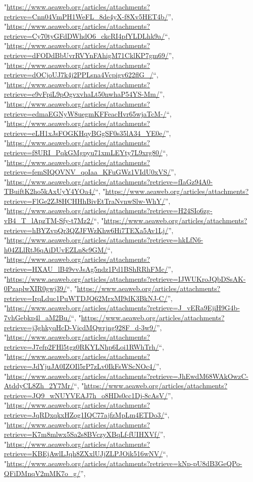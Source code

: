 \documentclass[]{article}
\begin{document}
\begin{itemize}
  "\url{https://www.aeaweb.org/articles/attachments?retrieve=Cnn04VmPH1WeFL_8de4yX-f8Xv5HET4b/}'',
  "\url{https://www.aeaweb.org/articles/attachments?retrieve=Cy70tyGFdDWhdO6_ckcRI4pfYLDLhk9a/}``,
  "\url{https://www.aeaweb.org/articles/attachments?retrieve=dFODdBbUvrRVYnFAhigM71CklKP7gm69/}'',
  "\url{https://www.aeaweb.org/articles/attachments?retrieve=dOCjoUJ7k4j2PPLsna4Vcpigv622flG_/}``,
  "\url{https://www.aeaweb.org/articles/attachments?retrieve=e9vFpiL9pOgvxvhaLt50nwhaP54YS-Mm/}'',
  "\url{https://www.aeaweb.org/articles/attachments?retrieve=edmaEGNyW8uegmKFFeacHvr65wjaTcM-/}``,
  "\url{https://www.aeaweb.org/articles/attachments?retrieve=eLH1xJsFOGKHqyBGgSF0s35lA34_YE0e/}'',
  "\url{https://www.aeaweb.org/articles/attachments?retrieve=f8URI_PqkGMgpyu71xmLEYty7L9xrg80/}``,
  "\url{https://www.aeaweb.org/articles/attachments?retrieve=femSIQOVNV_qoIaa_KFuGWz1VIdU0xVS/}'',
  "\url{https://www.aeaweb.org/articles/attachments?retrieve=fIaGz94A0-TBuiftK2ho5kAxUyY4YOa4/}``,
  "\url{https://www.aeaweb.org/articles/attachments?retrieve=FlGe2ZJ8HCHHhBivEtTraNvnwSlw-WhY/}'',
  "\url{https://www.aeaweb.org/articles/attachments?retrieve=H24SIo6zg-vB4_T_lApzTM-Sfy-t7Mz2/}``,
  "\url{https://www.aeaweb.org/articles/attachments?retrieve=hBYZvpQr3QZJFWzKhw6Hi7TEXa5Av1Lj/}'',
  "\url{https://www.aeaweb.org/articles/attachments?retrieve=hkLfN6-h04ZLlRtJ6qAiDUvEZLn8c9GM/}``,
  "\url{https://www.aeaweb.org/articles/attachments?retrieve=HXAU_lB49vvJsAg5ndz1Pd1BShRRhFMc/}'',
  "\url{https://www.aeaweb.org/articles/attachments?retrieve=IJWUKroJQbDSsAK-0PzaplwXIR0gwj39/}``,
  "\url{https://www.aeaweb.org/articles/attachments?retrieve=IrqLduc1PuWTDJQ62MrxMI9dK3BkNJ-C/}'',
  "\url{https://www.aeaweb.org/articles/attachments?retrieve=J_vERa9EjiH9G4b-7vhGebkp4l_aM2Bu/}``,
  "\url{https://www.aeaweb.org/articles/attachments?retrieve=j3ghkyqHcD-VicdMQwrjng928F_d-3w9/}'',
  "\url{https://www.aeaweb.org/articles/attachments?retrieve=J7efp2FHl5tgz0RKYLNhp6Loi1RWhTrh/}``,
  "\url{https://www.aeaweb.org/articles/attachments?retrieve=JdYjuJA0IZOIl5rP7zLv0IkFsWScNOc4/}'',
  "\url{https://www.aeaweb.org/articles/attachments?retrieve=JhEwdM68WAkOwzC-AtddyCL8Zh_2Y7Mr/}``,
  "\url{https://www.aeaweb.org/articles/attachments?retrieve=JQ9_wNUYVEAJ7h_o8HDs0cc1Dj-8cAsV/}'',
  "\url{https://www.aeaweb.org/articles/attachments?retrieve=JqRDxqkxHZog1IQC77ajfzMpLm4ETDo3/}``,
  "\url{https://www.aeaweb.org/articles/attachments?retrieve=K7m8mlwx5Sa2s8BVczyXBqLf-fUIHXVf/}'',
  "\url{https://www.aeaweb.org/articles/attachments?retrieve=KBEjAwlLJqh8ZXxlUJjZLPJOik516wNV/}``,
  "\url{https://www.aeaweb.org/articles/attachments?retrieve=kNp-pU8dB3GeQPo-QFiDMnqV2mMK7o_g/}'',

\end{itemize}
\end{document}
